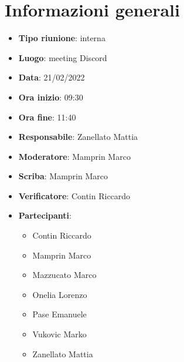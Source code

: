 \section{Informazioni generali}
\begin{itemize}
  \item \textbf{Tipo riunione}: interna
  \item \textbf{Luogo}: meeting Discord
  \item \textbf{Data}: 21/02/2022
  \item \textbf{Ora inizio}: 09:30
  \item \textbf{Ora fine}: 11:40
  \item \textbf{Responsabile}: Zanellato Mattia
  \item \textbf{Moderatore}: Mamprin Marco
  \item \textbf{Scriba}: Mamprin Marco
  \item \textbf{Verificatore}: Contin Riccardo
  \item \textbf{Partecipanti}:
  \begin{itemize}
    \item Contin Riccardo
    \item Mamprin Marco
    \item Mazzucato Marco
    \item Onelia Lorenzo
    \item Pase Emanuele
    \item Vukovic Marko
    \item Zanellato Mattia
  \end{itemize}
\end{itemize}
